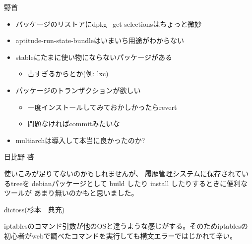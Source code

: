 \begin{prework}{ 野首 }

\begin{itemize}
 \item パッケージのリストアにdpkg --get-selectionsはちょっと微妙
 \item aptitude-run-state-bundleはいまいち用途がわからない
 \item stableにたまに使い物にならないパッケージがある
       \begin{itemize}
	\item 古すぎるからとか(例: lxc)
       \end{itemize}

 \item パッケージのトランザクションが欲しい
       \begin{itemize}
	\item 一度インストールしてみておかしかったらrevert
	\item 問題なければcommitみたいな
       \end{itemize} 
\item multiarchは導入して本当に良かったのか?
\end{itemize}

\end{prework}

\begin{prework}{ 日比野 啓 }

使いこみが足りてないのかもしれませんが、
履歴管理システムに保存されているtreeを
debianパッケージとして build したり
install したりするときに便利なツールが
あまり無いのかもと思いました。

\end{prework}

\begin{prework}{ dictoss(杉本　典充) }

iptablesのコマンド引数が他のOSと違うような感じがする。そのためiptablesの初心者がwebで調べたコマンドを実行しても構文エラーではじかれて辛い。
\end{prework}
